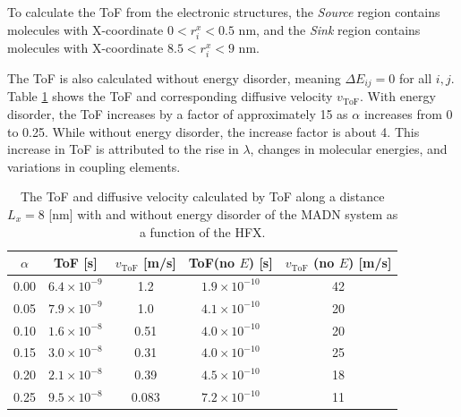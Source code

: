 \documentclass[letterpaper,12pt]{article}
\begin{document}
To calculate the ToF from the electronic structures, the \textit{Source} region contains molecules with X-coordinate $0 < r^x_i < 0.5$ nm, and the \textit{Sink} region contains molecules with X-coordinate $8.5 < r^x_i < 9$ nm. 

The ToF is also calculated without energy disorder, meaning $\Delta E_{ij}=0$ for all $i,j$.
Table \ref{tab:ToF_MADN_HFX} shows the ToF and corresponding diffusive velocity $v_\text{ToF}$.
With energy disorder, the ToF increases by a factor of approximately 15 as $\alpha$ increases from 0 to 0.25.  
While without energy disorder, the increase factor is about 4. This increase in ToF is attributed to the rise in $\lambda$, changes in molecular energies, and variations in coupling elements.

\begin{table}[H]
    \centering
    \begin{tabular}{c c c c c}
    \hline
        $\alpha$ & ToF [s] & $v_\text{ToF}$ [m/s] & ToF(no $E$) [s] & $v_\text{ToF}$ (no $E$) [m/s] \\
    \hline
        0.00 &  $6.4 \times 10^{-9}$ & 1.2 & $1.9 \times 10^{-10}$ & 42 \\
        0.05 & $ 7.9 \times 10^{-9}$ & 1.0 & $4.1 \times 10^{-10}$ & 20 \\
        0.10 & $ 1.6 \times 10^{-8}$ & 0.51 & $4.0 \times 10^{-10} $ & 20 \\
        0.15 & $ 3.0 \times 10^{-8}$ & 0.31 & $4.0 \times 10^{-10} $ & 25 \\
        0.20 & $ 2.1 \times 10^{-8}$ & 0.39 & $4.5 \times 10^{-10}$ & 18 \\
        0.25 & $ 9.5 \times 10^{-8}$ & 0.083 & $7.2 \times 10^{-10}$ & 11 \\
    \hline
    \end{tabular}
    \caption{The ToF and diffusive velocity calculated by ToF along a distance $L_x = 8$ [nm] with and without energy disorder of the MADN system as a function of the HFX. }
    \label{tab:ToF_MADN_HFX}
\end{table}
\end{document}
